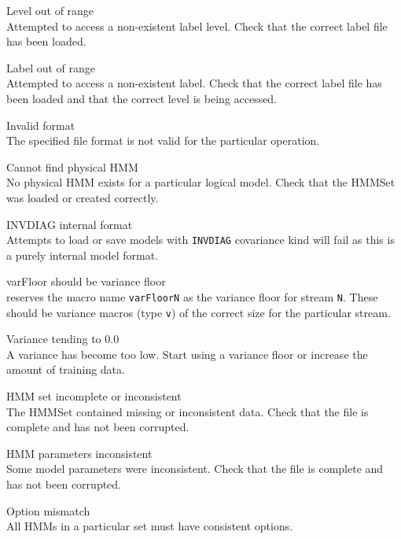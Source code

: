 \begin{itemize}
\begin{itemize}
    Level out of range\\
        Attempted to access a non-existent label level.  Check that the correct
        label file has been loaded.

    Label out of range\\
        Attempted to access a non-existent label.  Check that the correct
        label file has been loaded and that the correct level is being 
        accessed.

    Invalid format\\
        The specified file format is not valid for the particular operation.

\end{itemize}


\begin{itemize}
    Cannot find physical HMM\\
        No physical HMM exists for a particular logical model.  Check that the
        HMMSet was loaded or created correctly.

    INVDIAG internal format\\
        Attempts to load or save models with \texttt{INVDIAG} covariance kind
        will fail as this is a purely internal model format.

 varFloor should be variance floor\\
         reserves the macro name \texttt{varFloorN} as the 
        variance floor for stream \texttt{N}.  These should be variance 
        macros (type \texttt{v}) of the correct size for the particular stream.

    Variance tending to 0.0\\
        A variance has become too low.  Start using a variance floor or 
        increase the amount of training data.

    HMM set incomplete or inconsistent\\
        The HMMSet contained missing or inconsistent data.  Check that the 
        file is complete and has not been corrupted.

    HMM parameters inconsistent\\
        Some model parameters were inconsistent.  Check that the file is 
        complete and has not been corrupted.

 Option mismatch\\
        All HMMs in a particular set must have consistent options.


\end{itemize}
\end{itemize}
